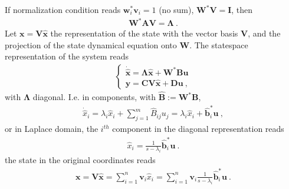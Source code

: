 \documentclass[letterpaper,10pt,english]{jupyterBook}
\begin{document}
\sphinxAtStartPar
If normalization condition reads \(\mathbf{w}_i^* \mathbf{v}_i = 1\) (no sum), \(\mathbf{W}^* \mathbf{V} = \mathbf{I}\), then
\begin{equation*}
\begin{split}\mathbf{W}^* \mathbf{A} \mathbf{V} = \boldsymbol{\Lambda} \ .\end{split}
\end{equation*}
\sphinxAtStartPar
{} Let \(\mathbf{x} = \mathbf{V} \hat{\mathbf{x}}\) the representation of the state with the vector basis \(\mathbf{V}\), and the projection of the state dynamical equation onto \(\mathbf{W}\). The state\sphinxhyphen{}space representation of the system reads
\begin{equation*}
\begin{split}\left\{\begin{aligned}
  \dot{\hat{\mathbf{x}}} = \boldsymbol{\Lambda} \hat{\mathbf{x}} + \mathbf{W}^* \mathbf{B} \mathbf{u} \\
            \mathbf{y}   = \mathbf{C} \mathbf{V} \hat{\mathbf{x}} + \mathbf{D} \mathbf{u}  \ ,
\end{aligned}\right. \end{split}
\end{equation*}
\sphinxAtStartPar
with \(\boldsymbol{\Lambda}\) diagonal. I.e. in components, with \(\hat{\mathbf{B}} := \mathbf{W}^* \mathbf{B}\),
\begin{equation*}
\begin{split}\dot{\hat{x}}_i = \lambda_i \hat{x}_i + \sum_{j=1}^{m} \hat{B}_{ij} u_j = \lambda_i \hat{x}_i + \hat{\mathbf{b}}_i^* \mathbf{u} \ ,\end{split}
\end{equation*}
\sphinxAtStartPar
or in Laplace domain, the \(i^{th}\) component in the diagonal representation reads
\begin{equation*}
\begin{split}\hat{x}_i = \frac{1}{s - \lambda_i} \hat{\mathbf{b}}_i^* \mathbf{u} \ .\end{split}
\end{equation*}
\sphinxAtStartPar
the state in the original coordinates reads
\begin{equation*}
\begin{split}\mathbf{x} = \mathbf{V} \hat{\mathbf{x}} = \sum_{i=1}^{n} \mathbf{v}_i \hat{x}_i = \sum_{i=1}^{n} \mathbf{v}_i  \frac{1}{s - \lambda_i} \hat{\mathbf{b}}_i^* \mathbf{u} \ .\end{split}
\end{equation*}
\end{document}
